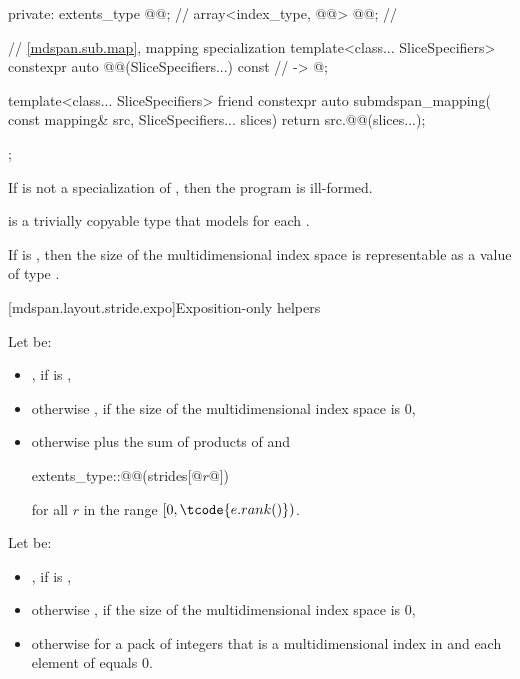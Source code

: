 \begin{codeblock}
{{  private:
    extents_type @@{};                    // \expos
    array<index_type, @@> @@{};        // \expos

    // \ref{mdspan.sub.map},  mapping specialization
    template<class... SliceSpecifiers>
      constexpr auto @@(SliceSpecifiers...) const       // \expos
        -> @\seebelow@;

    template<class... SliceSpecifiers>
      friend constexpr auto submdspan_mapping(
        const mapping& src, SliceSpecifiers... slices) {
          return src.@@(slices...);
      }
  };
}
\end{codeblock}

\pnum
If  is not a specialization of ,
then the program is ill-formed.

\pnum
{} is a trivially copyable type
that models  for each .

\pnum
\mandates
If  is ,
then the size of the multidimensional index space 
is representable as a value of type .

[mdspan.layout.stride.expo]{Exposition-only helpers}

\pnum
Let  be:
\begin{itemize}
\item
{}, if  is ,
\item
otherwise , if the size of the multidimensional index space  is 0,
\item
otherwise  plus the sum of products of
 and
\begin{codeblock}
extents_type::@@(strides[@$r$@])
\end{codeblock}
  for all $r$ in the range $[0, \tcode{e.rank()})$.
\end{itemize}

\pnum
Let  be:
\begin{itemize}
\item
{}, if  is ,
\item
otherwise , if the size of the multidimensional index space  is 0,
\item
otherwise  for a pack of integers 
that is a multidimensional index in  and
each element of  equals 0.
\end{itemize}


